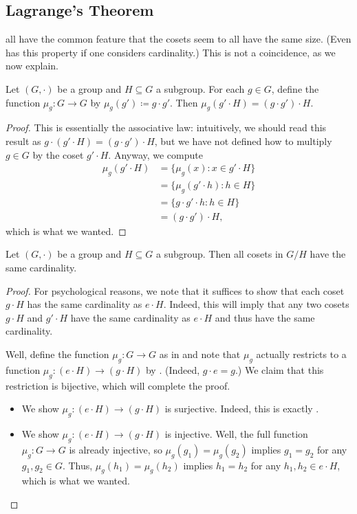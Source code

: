 \documentclass[../notes.tex]{subfiles}
\begin{document}
\subsection{Lagrange's Theorem}
 all have the common feature that the cosets seem to all have the same size. (Even  has this property if one considers cardinality.) This is not a coincidence, as we now explain.
\begin{lemma} \label{lem:mu-g-moves-cosets}
    Let $(G,\cdot)$ be a group and $H\subseteq G$ a subgroup. For each $g\in G$, define the function $\mu_g\colon G\to G$ by $\mu_g(g')\coloneqq g\cdot g'$. Then $\mu_g(g'\cdot H)=(g\cdot g')\cdot H$.
\end{lemma}
\begin{proof}
    This is essentially the associative law: intuitively, we should read this result as $g\cdot(g'\cdot H)=(g\cdot g')\cdot H$, but we have not defined how to multiply $g\in G$ by the coset $g'\cdot H$. Anyway, we compute
    \begin{align*}
        \mu_g(g'\cdot H) &= \{\mu_g(x):x\in g'\cdot H\} \\
        &= \{\mu_g(g'\cdot h):h\in H\} \\
        &= \{g\cdot g'\cdot h:h\in H\} \\
        &= (g\cdot g')\cdot H,
    \end{align*}
    which is what we wanted.
\end{proof}
\begin{theorem}[Lagrange] \label{thm:lagrange}
    Let $(G,\cdot)$ be a group and $H\subseteq G$ a subgroup. Then all cosets in $G/H$ have the same cardinality.
\end{theorem}
\begin{proof}
    For psychological reasons, we note that it suffices to show that each coset $g\cdot H$ has the same cardinality as $e\cdot H$. Indeed, this will imply that any two cosets $g\cdot H$ and $g'\cdot H$ have the same cardinality as $e\cdot H$ and thus have the same cardinality.
    
    Well, define the function $\mu_g\colon G\to G$ as in  and note that $\mu_g$ actually restricts to a function $\mu_g\colon(e\cdot H)\to(g\cdot H)$ by . (Indeed, $g\cdot e=g$.) We claim that this restriction is bijective, which will complete the proof.
    \begin{itemize}
        \item We show $\mu_g\colon(e\cdot H)\to(g\cdot H)$ is surjective. Indeed, this is exactly .
        \item We show $\mu_g\colon(e\cdot H)\to(g\cdot H)$ is injective. Well, the full function $\mu_g\colon G\to G$ is already injective, so $\mu_g(g_1)=\mu_g(g_2)$ implies $g_1=g_2$ for any $g_1,g_2\in G$. Thus, $\mu_g(h_1)=\mu_g(h_2)$ implies $h_1=h_2$ for any $h_1,h_2\in e\cdot H$, which is what we wanted.
        \qedhere
    \end{itemize}
\end{proof}
\end{document}
